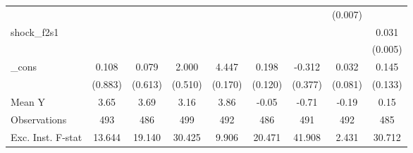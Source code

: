 {\begin{tabular}{l*{8}{c}}
            &                     &                     &                     &                     &                     &                     &     (0.007)         &                     \\
\addlinespace
shock\_f2s1  &                     &                     &                     &                     &                     &                     &                     &       0.031\sym{***}\\
            &                     &                     &                     &                     &                     &                     &                     &     (0.005)         \\
\addlinespace
\_cons      &       0.108         &       0.079         &       2.000\sym{***}&       4.447\sym{***}&       0.198         &      -0.312         &       0.032         &       0.145         \\
            &     (0.883)         &     (0.613)         &     (0.510)         &     (0.170)         &     (0.120)         &     (0.377)         &     (0.081)         &     (0.133)         \\
\midrule
Mean Y      &        3.65         &        3.69         &        3.16         &        3.86         &       -0.05         &       -0.71         &       -0.19         &        0.15         \\
Observations&         493         &         486         &         499         &         492         &         486         &         491         &         492         &         485         \\
Exc. Inst. F-stat&      13.644         &      19.140         &      30.425         &       9.906         &      20.471         &      41.908         &       2.431         &      30.712         \\
\bottomrule
\end{tabular}
}
